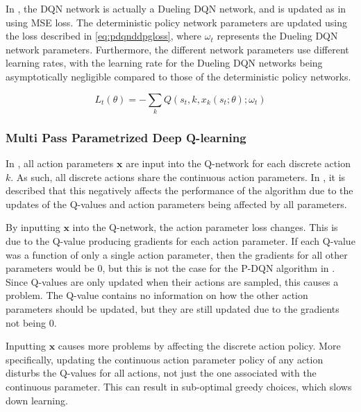 \documentclass{kththesis}
\begin{document}
In \textcite{xiong2018parametrized}, the DQN network is actually a Dueling DQN network, and is updated as in \textcite{mnih2015human} using MSE loss. The deterministic policy network parameters are updated using the loss described in \autoref{eq:pdqnddpgloss}, where $\omega_t$ represents the Dueling DQN network parameters. Furthermore, the different network parameters use different learning rates, with the learning rate for the Dueling DQN networks being asymptotically negligible compared to those of the deterministic policy networks. 

\begin{equation}
\label{eq:pdqnddpgloss}
L_t(\theta) = -\sum_kQ(s_t, k, x_k(s_t;\theta);\omega_t)
\end{equation}

\subsubsection{Multi Pass Parametrized Deep Q-learning}
In \textcite{xiong2018parametrized}, all action parameters $\boldsymbol{x}$ are input into the Q-network for each discrete action $k$. As such, all discrete actions share the continuous action parameters. In \textcite{bester2019mpdqn}, it is described that this negatively affects the performance of the algorithm due to the updates of the Q-values and action parameters being affected by all parameters. 

By inputting $\boldsymbol{x}$ into the Q-network, the action parameter loss changes. This is due to the Q-value producing gradients for each action parameter. If each Q-value was a function of only a single action parameter, then the gradients for all other parameters would be $0$, but this is not the case for the P-DQN algorithm in \textcite{xiong2018parametrized}. Since Q-values are only updated when their actions are sampled, this causes a problem. The Q-value contains no information on how the other action parameters should be updated, but they are still updated due to the gradients not being $0$. 

Inputting $\boldsymbol{x}$ causes more problems by affecting the discrete action policy. More specifically, updating the continuous action parameter policy of any action disturbs the Q-values for all actions, not just the one associated with the continuous parameter. This can result in sub-optimal greedy choices, which slows down learning. \parencite{bester2019mpdqn}
\end{document}
